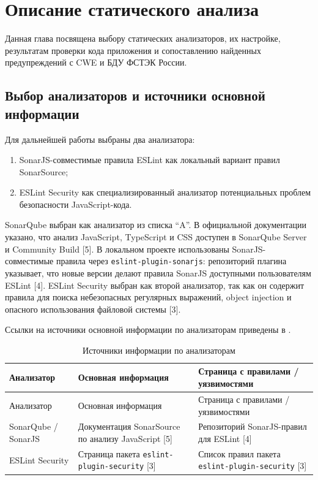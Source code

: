 \chapter{Описание статического анализа} \label{ch3}

Данная глава посвящена выбору статических анализаторов, их настройке, результатам
проверки кода приложения и сопоставлению найденных предупреждений с CWE и БДУ
ФСТЭК России.

\section{Выбор анализаторов и источники основной информации} \label{ch3:sec1}

Для дальнейшей работы выбраны два анализатора:
\begin{enumerate}
    \item SonarJS-совместимые правила ESLint как локальный вариант правил SonarSource;
    \item ESLint Security как специализированный анализатор потенциальных проблем безопасности JavaScript-кода.
\end{enumerate}

SonarQube выбран как анализатор из списка ``A''. В официальной документации
указано, что анализ JavaScript, TypeScript и CSS доступен в SonarQube Server и
Community Build [5]. В локальном проекте использованы
SonarJS-совместимые правила через \texttt{eslint-plugin-sonarjs}: репозиторий
плагина указывает, что новые версии делают правила SonarJS доступными
пользователям ESLint [4]. ESLint Security выбран как второй
анализатор, так как он содержит правила для поиска небезопасных регулярных
выражений, object injection и опасного использования файловой системы
[3].

Ссылки на источники основной информации по анализаторам приведены в
.

\noindent
\begingroup
\centering
\small
\begin{longtable}[c]{|p{4cm}|p{5.5cm}|p{5.5cm}|}
    \caption{Источники информации по анализаторам}
    \label{tab:analyzer-links}
    \\
    \hline
    Анализатор & Основная информация & Страница с правилами / уязвимостями \\ \hline
    \endfirsthead
    \hline
    Анализатор & Основная информация & Страница с правилами / уязвимостями \\ \hline
    \endhead
    \hline
    SonarQube / SonarJS & Документация SonarSource по анализу JavaScript [5] & Репозиторий SonarJS-правил для ESLint [4] \\ \hline
    ESLint Security & Страница пакета \texttt{eslint-plugin-security} [3] & Список правил пакета \texttt{eslint-plugin-security} [3] \\ \hline
\end{longtable}
\normalsize
\endgroup

